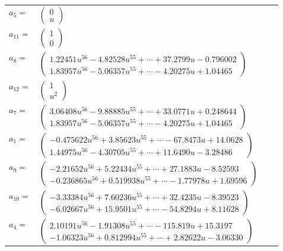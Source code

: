 \documentclass[1p]{elsarticle_modified}
\theoremstyle{definition}
\begin{document}
\begin{tabular}{m{7pt} m{180pt} m{7pt} m{180pt} }
\flushright $a_{5}=$&$\begin{pmatrix}0\\u\end{pmatrix}$ \\
\flushright $a_{11}=$&$\begin{pmatrix}1\\0\end{pmatrix}$ \\
\flushright $a_{8}=$&$\begin{pmatrix}1.22451 u^{56}-4.82528 u^{55}+\cdots+37.2799 u-0.796002\\1.83957 u^{56}-5.06357 u^{55}+\cdots-4.20275 u+1.04465\end{pmatrix}$ \\
\flushright $a_{12}=$&$\begin{pmatrix}1\\u^2\end{pmatrix}$ \\
\flushright $a_{7}=$&$\begin{pmatrix}3.06408 u^{56}-9.88885 u^{55}+\cdots+33.0771 u+0.248644\\1.83957 u^{56}-5.06357 u^{55}+\cdots-4.20275 u+1.04465\end{pmatrix}$ \\
\flushright $a_{1}=$&$\begin{pmatrix}-0.475622 u^{56}+3.85623 u^{55}+\cdots-67.8473 u+14.0628\\1.44975 u^{56}-4.30705 u^{55}+\cdots+11.6490 u-3.28486\end{pmatrix}$ \\
\flushright $a_{9}=$&$\begin{pmatrix}-2.21652 u^{56}+5.22434 u^{55}+\cdots+27.1883 u-8.52593\\-0.236865 u^{56}+0.519938 u^{55}+\cdots-1.77978 u+1.69596\end{pmatrix}$ \\
\flushright $a_{10}=$&$\begin{pmatrix}-3.33384 u^{56}+7.60236 u^{55}+\cdots+32.4235 u-8.39523\\-6.02667 u^{56}+15.9501 u^{55}+\cdots-54.8294 u+8.11628\end{pmatrix}$ \\
\flushright $a_{4}=$&$\begin{pmatrix}2.10191 u^{56}-1.91308 u^{55}+\cdots-115.819 u+15.3197\\-1.06323 u^{56}+0.812994 u^{55}+\cdots+2.82622 u-3.06330\end{pmatrix}$ \\

\end{tabular}
\end{document}
